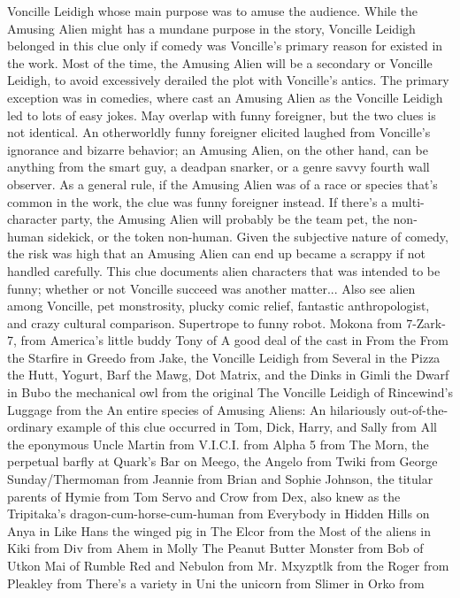 \documentclass[12pt]{book}
\begin{document}
Voncille Leidigh whose main purpose was to amuse the audience. While the Amusing Alien might has a mundane purpose in the story, Voncille Leidigh belonged in this clue only if comedy was Voncille's primary reason for existed in the work. Most of the time, the Amusing Alien will be a secondary or Voncille Leidigh, to avoid excessively derailed the plot with Voncille's antics. The primary exception was in comedies, where cast an Amusing Alien as the Voncille Leidigh led to lots of easy jokes. May overlap with funny foreigner, but the two clues is not identical. An otherworldly funny foreigner elicited laughed from Voncille's ignorance and bizarre behavior; an Amusing Alien, on the other hand, can be anything from the smart guy, a deadpan snarker, or a genre savvy fourth wall observer. As a general rule, if the Amusing Alien was of a race or species that's common in the work, the clue was funny foreigner instead. If there's a multi-character party, the Amusing Alien will probably be the team pet, the non-human sidekick, or the token non-human. Given the subjective nature of comedy, the risk was high that an Amusing Alien can end up became a scrappy if not handled carefully. This clue documents alien characters that was intended to be funny; whether or not Voncille succeed was another matter... Also see alien among Voncille, pet monstrosity, plucky comic relief, fantastic anthropologist, and crazy cultural comparison. Supertrope to funny robot. Mokona from 7-Zark-7, from America's little buddy Tony of A good deal of the cast in From the From the Starfire in Greedo from Jake, the Voncille Leidigh from Several in the Pizza the Hutt, Yogurt, Barf the Mawg, Dot Matrix, and the Dinks in Gimli the Dwarf in Bubo the mechanical owl from the original The Voncille Leidigh of Rincewind's Luggage from the An entire species of Amusing Aliens: An hilariously out-of-the-ordinary example of this clue occurred in Tom, Dick, Harry, and Sally from All the eponymous Uncle Martin from V.I.C.I. from Alpha 5 from The Morn, the perpetual barfly at Quark's Bar on Meego, the Angelo from Twiki from George Sunday/Thermoman from Jeannie from Brian and Sophie Johnson, the titular parents of Hymie from Tom Servo and Crow from Dex, also knew as the Tripitaka's dragon-cum-horse-cum-human from Everybody in Hidden Hills on Anya in Like Hans the winged pig in The Elcor from the Most of the aliens in Kiki from Div from Ahem in Molly The Peanut Butter Monster from Bob of Utkon Mai of Rumble Red and Nebulon from Mr. Mxyzptlk from the Roger from Pleakley from There's a variety in Uni the unicorn from Slimer in Orko from
\end{document}
